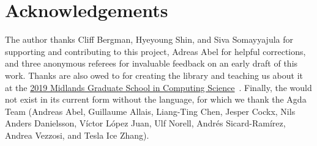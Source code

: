 \section*{Acknowledgements}
The author thanks Cliff Bergman, Hyeyoung Shin, and Siva Somayyajula for supporting and contributing to this project, Adreas Abel for helpful corrections, and three anonymous referees for invaluable feedback on an early draft of this work.  Thanks are also owed to \MartinEscardo for creating the \typetopology library and teaching us about it at the \href{http://events.cs.bham.ac.uk/mgs2019/}{2019 Midlands Graduate School in Computing Science}~\cite{MHE}. Finally, the \agdaualib would not exist in its current form without the \agda language, for which we thank the Agda Team (Andreas Abel, Guillaume Allais, Liang-Ting Chen, Jesper Cockx, Nils Anders Danielsson, Víctor López Juan, Ulf Norell, Andrés Sicard-Ramírez, Andrea Vezzosi, and Tesla Ice Zhang).



